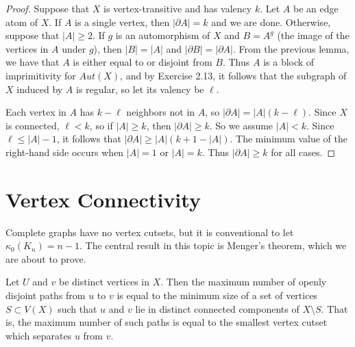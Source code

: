 \begin{proof}
Suppose that $X$ is vertex-transitive and has valency $k$.  Let $A$ be an edge atom of $X$.  If $A$ is a single vertex, then $|\partial A|=k$ and we are done.  Otherwise, suppose that $|A|\geq 2$.  If $g$ is an automorphism of $X$ and $B=A^g$ (the image of the vertices in $A$ under $g$), then $|B|=|A|$ and $|\partial B|=|\partial A|$.  From the previous lemma, we have that $A$ is either equal to or disjoint from $B$. Thus $A$ is a block of imprimitivity for $Aut(X)$, and by Exercise 2.13, it follows that the subgraph of $X$ induced by $A$ is regular, so let its valency be $\ell$.

Each vertex in $A$ has $k-\ell$ neighbors not in $A$, so $|\partial A|=|A|(k-\ell)$. Since $X$ is connected, $\ell<k$, so if $|A|\geq k$, then  $|\partial A|\geq k$.  So we assume $|A|<k$.  Since $\ell\leq |A|-1$, it follows that $|\partial A|\geq |A|(k+1-|A|)$.  The minimum value of the right-hand side occurs when $|A|=1$ or $|A|=k$.  Thus $|\partial A|\geq k$ for all cases.
\end{proof}

\section*{Vertex Connectivity}



Complete graphs have no vertex cutsets, but it is conventional to let $\kappa_0(K_n)=n-1$.  The central result in this topic is Menger's theorem, which we are about to prove.


\begin{theorem}[Menger]

{Let $U$ and $v$ be distinct vertices in $X$.  Then the maximum number of openly disjoint paths from $u$ to $v$ is equal to the minimum size of a set of vertices $S\subset V(X)$ such that $u$ and $v$ lie in distinct connected components of $X\setminus S$.  That is, the maximum number of such paths is equal to the smallest vertex cutset which separates $u$ from $v$.}
\end{theorem}

